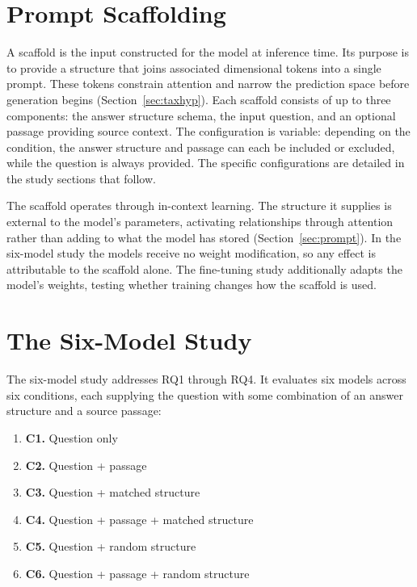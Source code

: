 \documentclass[master]{thesis}
\newcommand{\sref}[1]{Section~\ref{#1}}  %
\begin{document}
\section{Prompt Scaffolding}

A scaffold is the input constructed for the model at inference time. Its purpose is to provide a structure that joins associated dimensional tokens into a single prompt. These tokens constrain attention and narrow the prediction space before generation begins (\sref{sec:taxhyp}). Each scaffold consists of up to three components: the answer structure schema, the input question, and an optional passage providing source context. The configuration is variable: depending on the condition, the answer structure and passage can each be included or excluded, while the question is always provided. The specific configurations are detailed in the study sections that follow.

The scaffold operates through in-context learning. The structure it supplies is external to the model's parameters, activating relationships through attention rather than adding to what the model has stored (\sref{sec:prompt}). In the six-model study the models receive no weight modification, so any effect is attributable to the scaffold alone. The fine-tuning study additionally adapts the model's weights, testing whether training changes how the scaffold is used.

\section{The Six-Model Study}
\label{sec:sixmodel-method}

The six-model study addresses RQ1 through RQ4. It evaluates six models across six conditions, each supplying the question with some combination of an answer structure and a source passage:

\begin{enumerate}
  \item \textbf{C1.} Question only
  \item \textbf{C2.} Question + passage
  \item \textbf{C3.} Question + matched structure
  \item \textbf{C4.} Question + passage + matched structure
  \item \textbf{C5.} Question + random structure
  \item \textbf{C6.} Question + passage + random structure
\end{enumerate}
\end{document}
